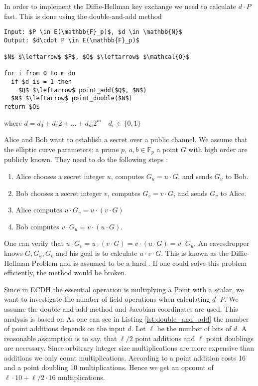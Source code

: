 In order to implement the Diffie-Hellman key exchange we need to calculate $d \cdot P$ fast. This is done using the double-and-add method
\begin{lstlisting}[frame=single, mathescape=true, captionpos=b, caption=double-and-add method \cite{double_and_add}, label=lst:double_and_add]
Input: $P \in E(\mathbb{F}_p)$, $d \in \mathbb{N}$
Output: $d\cdot P \in E(\mathbb{F}_p)$

$N$ $\leftarrow$ $P$, $Q$ $\leftarrow$ $\mathcal{O}$

for i from 0 to m do
  if $d_i$ = 1 then
    $Q$ $\leftarrow$ point_add($Q$, $N$)
  $N$ $\leftarrow$ point_double($N$)
return $Q$
\end{lstlisting}
where $d = d_0 + d_1 2 + ... + d_m 2^m \quad d_i \, \in \{0,1\}$

Alice and Bob want to establish a secret over a public channel. We assume that the elliptic curve parameters: a prime $p$, $a, b \in \mathbb{F}_p$ a point $G$ with high order are publicly known. They need to do the following steps \cite{Washington:2008}: 
\begin{enumerate}
\item{Alice chooses a secret integer $u$, computes $G_u = u \cdot G$, and sends $G_u$ to Bob.}
\item{Bob chooses a secret integer $v$, computes $G_v = v \cdot G$, and sends $G_v$ to Alice.}
\item{Alice computes $u \cdot G_v = u \cdot (v \cdot G)$}
\item{Bob computes $v \cdot G_u = v \cdot (u \cdot G)$.}
\end{enumerate}
One can verify that $u \cdot G_v = u \cdot (v \cdot G) = v\cdot (u \cdot G) = v \cdot G_u$. An eavesdropper knows $G, G_u, G_v$ and his goal is to calculate $u \cdot v \cdot G$. This is known as the Diffie-Hellman Problem and is assumed to be a hard \cite{Washington:2008}. If one could solve this problem efficiently, the method would be broken.

Since in ECDH the essential operation is multiplying a Point with a scalar, we want to investigate the number of field operations when calculating $d \cdot P$. We assume the double-and-add method and Jacobian coordinates are used. This analysis is based on \cite[p. 63]{Blake:1999} As one can see in Listing \ref{lst:double_and_add} the number of point additions depends on the input $d$. Let $\ell$ be the number of bits of $d$. A reasonable assumption is to say, that $\ell / 2$ point additions and $\ell$ point doublings are necessary. Since arbitrary integer size multiplications are more expensive than additions we only count multiplications. According to \cite[p. 59, 60]{Brown:2009} a point addition costs 16 and a point doubling 10 multiplications. Hence we get an opcount of $\ell \cdot 10 + \ell / 2 \cdot 16$ multiplications.

